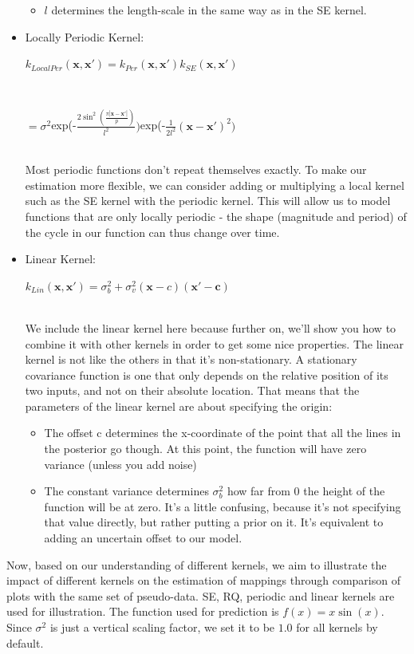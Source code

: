\documentclass{article}
\begin{document}
\begin{itemize}
\begin{itemize}
        \item  $l$ determines the length-scale in the same way as in the SE kernel.
    \end{itemize}
    \item Locally Periodic Kernel:\vspace{5mm}\\
    \centerline{$k_{LocalPer}(\mathbf{x}, \mathbf{x'}) = k_{Per}(\mathbf{x}, \mathbf{x'})k_{SE}(\mathbf{x}, \mathbf{x'})$}\\
    \centerline{$= \sigma^2$exp(-$\frac{2\sin ^2(\frac{\pi|\mathbf{x}-\mathbf{x'}|}{p})}{l^2})$exp(-$\frac{1}{2l^2}(\mathbf{x}-\mathbf{x'})^2)$}\vspace{5mm}\\
    Most periodic functions don't repeat themselves exactly. To make our estimation more flexible, we can consider adding or multiplying a local kernel such as the SE kernel with the periodic kernel. This will allow us to model functions that are only locally periodic - the shape (magnitude and period) of the cycle in our function can thus change over time.\\
    \item Linear Kernel:\vspace{5mm}\\
    \centerline{$k_{Lin}(\mathbf{x}, \mathbf{x'}) = \sigma_{b}^2 + \sigma_{v}^2(\mathbf{x}-c)(\mathbf{x'-c})$}\vspace{5mm}\\
    We include the linear kernel here because further on, we'll show you how to combine it with other kernels in order to get some nice properties. The linear kernel is not like the others in that it's non-stationary. A stationary covariance function is one that only depends on the relative position of its two inputs, and not on their absolute location. That means that the parameters of the linear kernel are about specifying the origin:
    \begin{itemize}
        \item The offset c determines the x-coordinate of the point that all the lines in the posterior go though. At this point, the function will have zero variance (unless you add noise)
        \item The constant variance determines $\sigma_{b}^2$ how far from 0 the height of the function will be at zero. It's a little confusing, because it's not specifying that value directly, but rather putting a prior on it. It's equivalent to adding an uncertain offset to our model.
    \end{itemize}
\end{itemize}\vspace{5mm}
Now, based on our understanding of different kernels, we aim to illustrate the impact of different kernels on the estimation of mappings through comparison of plots with the same set of pseudo-data. SE, RQ, periodic and linear kernels are used for illustration. The function used for prediction is $f(x) = x\sin(x)$. Since $\sigma^2$ is just a vertical scaling factor, we set it to be $1.0$ for all kernels by default.  \vspace{5mm}\\
\end{document}
